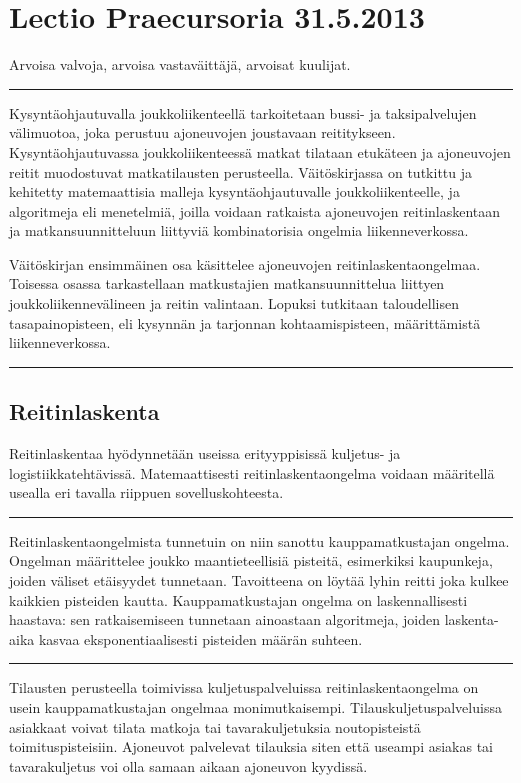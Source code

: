 \documentclass[a4paper,12pt]{article}
\newcommand*\sepline{%
  \begin{center}
    \rule[1ex]{.5\textwidth}{.5pt}
  \end{center}}
\begin{document}
\section*{Lectio Praecursoria 31.5.2013}   %
Arvoisa valvoja, arvoisa vastaväittäjä, arvoisat kuulijat.
\sepline
Kysyntäohjautuvalla joukkoliikenteellä tarkoitetaan bussi- ja taksipalvelujen välimuotoa, joka perustuu %
ajoneuvojen joustavaan reititykseen. Kysyntäohjautuvassa joukkoliikenteessä matkat tilataan etukäteen ja
ajoneuvojen reitit muodostuvat matkatilausten perusteella.
Väitöskirjassa on tutkittu ja kehitetty matemaattisia malleja kysyntäohjautuvalle joukkoliikenteelle, ja algoritmeja eli menetelmiä,
joilla voidaan ratkaista ajoneuvojen reitinlaskentaan ja matkansuunnitteluun liittyviä kombinatorisia ongelmia liikenneverkossa.

Väitöskirjan ensimmäinen osa käsittelee ajoneuvojen reitinlaskentaongelmaa. %
Toisessa osassa tarkastellaan matkustajien matkansuunnittelua liittyen joukkoliikennevälineen ja reitin valintaan.
Lopuksi tutkitaan taloudellisen tasapainopisteen, eli kysynnän ja tarjonnan kohtaamispisteen, määrittämistä liikenneverkossa.

\sepline

\subsection*{Reitinlaskenta}
Reitinlaskentaa hyödynnetään useissa erityyppisissä kuljetus- ja logistiikkatehtävissä. 
Matemaattisesti reitinlaskentaongelma voidaan määritellä usealla eri tavalla riippuen sovelluskohteesta.
\sepline

Reitinlaskentaongelmista tunnetuin on niin sanottu kauppamatkustajan ongelma. Ongelman määrittelee joukko maantieteellisiä 
pisteitä, esimerkiksi kaupunkeja, joiden väliset etäisyydet tunnetaan. Tavoitteena on löytää lyhin reitti joka kulkee kaikkien pisteiden kautta.
Kauppamatkustajan ongelma on laskennallisesti haastava: sen ratkaisemiseen tunnetaan ainoastaan algoritmeja, joiden laskenta-aika kasvaa 
eksponentiaalisesti pisteiden määrän suhteen.

\sepline

Tilausten perusteella toimivissa kuljetuspalveluissa reitinlaskentaongelma on usein kauppamatkustajan ongelmaa monimutkaisempi. 
Tilauskuljetuspalveluissa asiakkaat voivat tilata matkoja tai tavarakuljetuksia noutopisteistä toimituspisteisiin. Ajoneuvot palvelevat 
tilauksia siten että useampi asiakas tai tavarakuljetus voi olla samaan aikaan ajoneuvon kyydissä.
\end{document}
